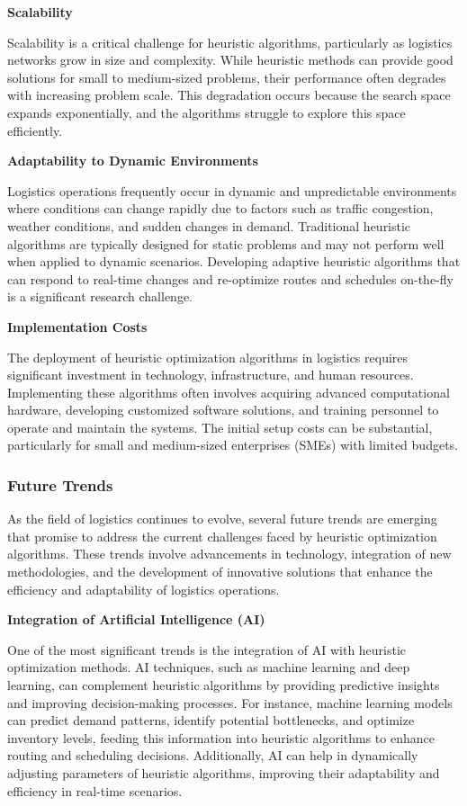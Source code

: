 \documentclass{article}
\begin{document}
    \textbf{Scalability}

    Scalability is a critical challenge for heuristic algorithms, particularly as logistics networks grow in size and complexity. While heuristic methods can provide good solutions for small to medium-sized problems, their performance often degrades with increasing problem scale. This degradation occurs because the search space expands exponentially, and the algorithms struggle to explore this space efficiently. \cite{Puri2023}

    \textbf{Adaptability to Dynamic Environments}

    Logistics operations frequently occur in dynamic and unpredictable environments where conditions can change rapidly due to factors such as traffic congestion, weather conditions, and sudden changes in demand. Traditional heuristic algorithms are typically designed for static problems and may not perform well when applied to dynamic scenarios. Developing adaptive heuristic algorithms that can respond to real-time changes and re-optimize routes and schedules on-the-fly is a significant research challenge. \cite{Ochelska2021}

    \textbf{Implementation Costs}

    The deployment of heuristic optimization algorithms in logistics requires significant investment in technology, infrastructure, and human resources. Implementing these algorithms often involves acquiring advanced computational hardware, developing customized software solutions, and training personnel to operate and maintain the systems. The initial setup costs can be substantial, particularly for small and medium-sized enterprises (SMEs) with limited budgets. \cite{Puri2023}

    \subsubsection{Future Trends}\label{subsec:future-trends}

    As the field of logistics continues to evolve, several future trends are emerging that promise to address the current challenges faced by heuristic optimization algorithms. These trends involve advancements in technology, integration of new methodologies, and the development of innovative solutions that enhance the efficiency and adaptability of logistics operations.

    \textbf{Integration of Artificial Intelligence (AI)}

    One of the most significant trends is the integration of AI with heuristic optimization methods. AI techniques, such as machine learning and deep learning, can complement heuristic algorithms by providing predictive insights and improving decision-making processes. For instance, machine learning models can predict demand patterns, identify potential bottlenecks, and optimize inventory levels, feeding this information into heuristic algorithms to enhance routing and scheduling decisions. Additionally, AI can help in dynamically adjusting parameters of heuristic algorithms, improving their adaptability and efficiency in real-time scenarios. \cite{Puri2023}
\end{document}
